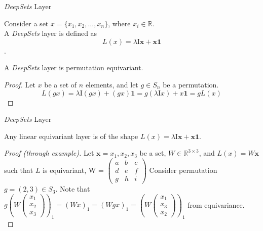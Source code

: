 \documentclass{beamer}
\begin{document}
\begin{frame}{\emph{DeepSets} Layer}

    \begin{definition}
        Consider a set $x = \{x_1, x_2, \ldots, x_n\}$, where $x_i \in \mathbb{R}$.\\
        A \emph{DeepSets} layer is defined as 
        \[L(x) = \lambda\mathrm{I}\mathbf{x} + \mathbf{x}\mathbf{1}\].
    \end{definition}

    \begin{theorem}
        A \emph{DeepSets} layer is permutation equivariant.
    \end{theorem}

    \begin{proof}
        Let $x$ be a set of $n$ elements, and let $g \in S_n$ be a permutation.
        \[ L(gx) = \lambda\mathrm{I}(gx) + (gx)\mathbf{1} = g(\lambda\mathrm{I}x) + x\mathbf{1} = gL(x)\]
    \end{proof}
\end{frame}
\begin{frame}{\emph{DeepSets} Layer}
    \begin{theorem}
        Any linear equivariant layer is of the shape \(L(x) = \lambda\mathrm{I}\mathbf{x} + \mathbf{x}\mathbf{1}\).
    \end{theorem}

    \renewcommand{\qedsymbol}{}
    \begin{proof}[Proof (through example)]
        Let $\mathbf{x}={x_1,x_2,x_3}$ be a set, $W \in \mathbb{R}^{3 \times 3}$, and $L(x) = W\mathbf{x}$ such that $L$ is equivariant, W = $\begin{pmatrix}
            a & b & c\\
            d & e & f\\
            g & h & i
        \end{pmatrix}$
        Consider permutation $g=(2,3) \in S_3$. Note that $g\left(W\begin{pmatrix}
            x_1\\
            x_2\\
            x_3
        \end{pmatrix}\right)_1=(Wx)_1 = (Wgx)_1 = \left(W\begin{pmatrix}
            x_1\\
            x_3\\
            x_2
        \end{pmatrix}\right)_1$ from equivariance.\\
    \end{proof}
    \renewcommand{\qedsymbol}{\ensuremath{\square}} 
\end{frame}
\end{document}
